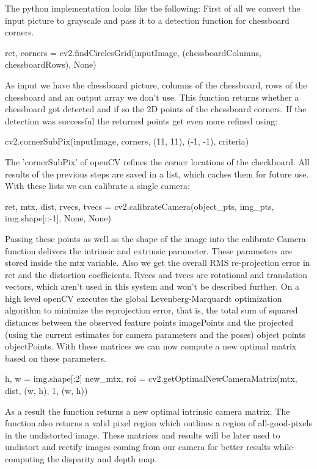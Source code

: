 \documentclass[journal,onecolumn]{IEEEtran}
\begin{document}
The python implementation looks like the following: \newline
First of all we convert the input picture to grayscale and pass it to a detection function for chessboard corners.
\begin{python}
ret, corners = cv2.findCirclesGrid(inputImage, (chessboardColumns, chessboardRows), None)
\end{python}
As input we have the chessboard picture, columns of the chessboard, rows of the chessboard and an output array we don't use.
This function returns whether a chessboard got detected and if so the 2D points of the chessboard corners. If the detection was successful the returned points get even more refined using:
\begin{python}
cv2.cornerSubPix(inputImage, corners, (11, 11), (-1, -1), criteria)
\end{python}
The 'cornerSubPix' of openCV refines the corner locations \cite{forstner} of the checkboard.
All results of the previous steps are saved in a list, which caches them for future use. With these lists we can calibrate a single camera:
\begin{python}
ret, mtx, dist, rvecs, tvecs = cv2.calibrateCamera(object_pts, img_pts, img.shape[::-1], None, 
											None)
\end{python}
Passing these points as well as the shape of the image into the calibrate Camera function delivers the intrinsic and extrinsic parameter.
These parameters are stored inside the mtx variable. Also we get the overall RMS re-projection error in ret and the distortion coefficients. Rvecs\cite{DBLP} and tvecs are rotational and translation vectors, which aren't used in this system and won't be described further.
On a high level openCV executes the global Levenberg-Marquardt optimization algorithm to minimize the reprojection error, that is, the total sum of squared distances between the observed feature points imagePoints and the projected (using the current estimates for camera parameters and the poses) object points objectPoints\cite{calibrateCamera}.
With these matrices we can now compute a new optimal matrix based on these parameters.
\begin{python}
h, w = img.shape[:2]
new_mtx, roi = cv2.getOptimalNewCameraMatrix(mtx, dist, (w, h), 1, (w, h))
\end{python}
As a result the function returns a new optimal intrinsic camera matrix. The function also returns a valid pixel region which outlines a region of all-good-pixels in the undistorted image. These matrices and results will be later used to undistort and rectify images coming from our camera for better results while computing the disparity and depth map.
\end{document}
